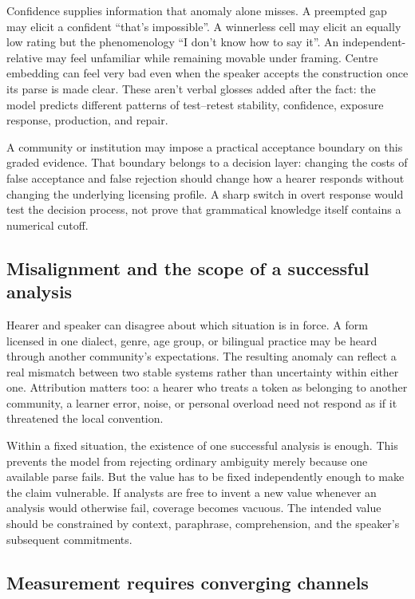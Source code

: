 Confidence supplies information that anomaly alone misses. A preempted gap may
elicit a confident \enquote{that's impossible}. A winnerless cell may elicit an
equally low rating but the phenomenology \enquote{I don't know how to say it}.
An independent-relative  may feel unfamiliar while remaining
movable under framing. Centre embedding can feel very bad even when the speaker
accepts the construction once its parse is made clear. These aren't verbal
glosses added after the fact: the model predicts different patterns of
test--retest stability, confidence, exposure response, production, and repair.

A community or institution may impose a practical acceptance boundary on this
graded evidence. That boundary belongs to a decision layer: changing the costs
of false acceptance and false rejection should change how a hearer responds
without changing the underlying licensing profile. A sharp switch in overt
response would test the decision process, not prove that grammatical
knowledge itself contains a numerical cutoff.

\subsection{Misalignment and the scope of a successful analysis}
\label{sec:scope-existential}
\label{sec:misalignment-conditioning}

Hearer and speaker can disagree about which situation is in force. A form
licensed in one dialect, genre, age group, or bilingual practice may be heard
through another community's expectations. The resulting anomaly can reflect a
real mismatch between two stable systems rather than uncertainty within either
one. Attribution matters too: a hearer who treats a token as belonging to
another community, a learner error, noise, or personal overload need not respond
as if it threatened the local convention.

Within a fixed situation, the existence of one successful analysis is enough.
This prevents the model from rejecting ordinary ambiguity merely because one
available parse fails. But the value has to be fixed independently enough to
make the claim vulnerable. If analysts are free to invent a new value whenever
an analysis would otherwise fail, coverage becomes vacuous. The intended value
should be constrained by context, paraphrase, comprehension, and the speaker's
subsequent commitments.

\subsection{Measurement requires converging channels}
\label{sec:measurement-C}

